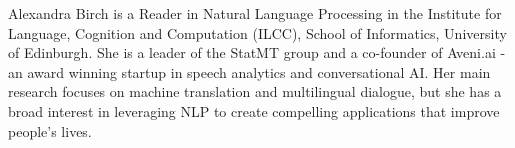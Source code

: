 Alexandra Birch is a Reader in Natural Language Processing in the Institute for Language, Cognition and Computation (ILCC), School of Informatics, University of Edinburgh. She is a leader of the StatMT group and a co-founder of Aveni.ai - an award winning startup in speech analytics and conversational AI. Her main research focuses on machine translation and multilingual dialogue, but she has a broad interest in leveraging NLP to create compelling applications that improve people's lives. 
